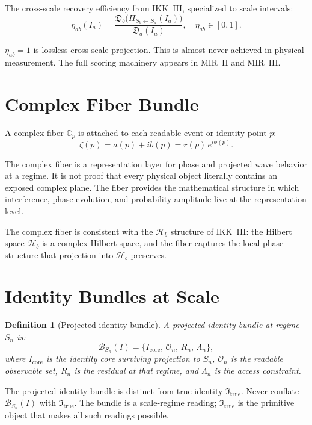 \documentclass[11pt,a4paper,oneside]{article}
\newtheorem{definition}{Definition}[section]
\newcommand{\Ia}{I_a}                               %
\newcommand{\Itrue}{\mathfrak{I}_{\mathrm{true}}}   %
\newcommand{\Hb}{\mathcal{H}_b}               %
\newcommand{\PiS}[2]{\Pi_{S_{#2}\leftarrow S_{#1}}}  %
\newcommand{\etaab}{\eta_{ab}}                 %
\newcommand{\D}{\mathfrak{D}}                  %
\begin{document}
The cross-scale recovery efficiency from IKK~III, specialized to scale intervals:
\[
\etaab(\Ia) = \frac{\D_b\!\big(\PiS{a}{b}(\Ia)\big)}{\D_a(\Ia)},\quad \etaab \in [0,1].
\]

$\etaab = 1$ is lossless cross-scale projection. This is almost never achieved in physical measurement. The full scoring machinery appears in MIR~II and MIR~III.

\section{Complex Fiber Bundle}

A complex fiber $\mathbb{C}_p$ is attached to each readable event or identity point $p$:
\[
\zeta(p) = a(p) + ib(p) = r(p)\, e^{i\phi(p)}.
\]

The complex fiber is a representation layer for phase and projected wave behavior at a regime. It is not proof that every physical object literally contains an exposed complex plane. The fiber provides the mathematical structure in which interference, phase evolution, and probability amplitude live at the representation level.

The complex fiber is consistent with the $\Hb$ structure of IKK~III: the Hilbert space $\Hb$ is a complex Hilbert space, and the fiber captures the local phase structure that projection into $\Hb$ preserves.

\section{Identity Bundles at Scale}

\begin{definition}[Projected identity bundle]
A projected identity bundle at regime $S_n$ is:
\[
\mathcal{B}_{S_n}(I) = \{I_{\mathrm{core}},\, \mathcal{O}_n,\, R_n,\, \Lambda_n\},
\]
where $I_{\mathrm{core}}$ is the identity core surviving projection to $S_n$, $\mathcal{O}_n$ is the readable observable set, $R_n$ is the residual at that regime, and $\Lambda_n$ is the access constraint.
\end{definition}

The projected identity bundle is distinct from true identity $\Itrue$. Never conflate $\mathcal{B}_{S_n}(I)$ with $\Itrue$. The bundle is a scale-regime reading; $\Itrue$ is the primitive object that makes all such readings possible.
\end{document}
